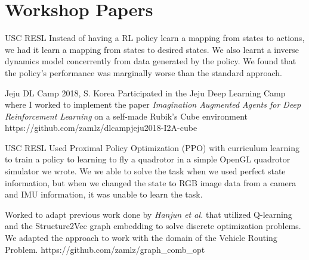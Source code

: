\documentclass{cv}
\begin{document}
\section{Workshop Papers}
\begin{adjustwidth}{0.5cm}{0.5cm}

\vspace{0.25cm}
\end{adjustwidth}

\begin{adjustwidth}{0.5cm}{0.5cm}

{USC RESL}
{Instead of having a RL policy learn a mapping from states to actions, we had
it learn a mapping from states to desired states. We also learnt a inverse
dynamics model concerrently from data generated by the policy. We found that
the policy's performance was marginally worse than the standard approach.}{}

{Jeju DL Camp 2018, S. Korea}
{Participated in the Jeju Deep Learning Camp where I worked to
implement the paper \textit{Imagination Augmented Agents for
Deep Reinforcement Learning} on a self-made Rubik's Cube environment}
{https://github.com/zamlz/dlcampjeju2018-I2A-cube}

{USC RESL}
{Used Proximal Policy Optimization (PPO) with curriculum learning to train a
policy to learning to fly a quadrotor in a simple OpenGL quadrotor simulator we
wrote. We we able to solve the task when we used perfect state information, but
when we changed the state to RGB image data from a camera and IMU information,
it was unable to learn the task.}{}

{Worked to adapt previous work done by \textit{Hanjun et al.} that utilized
Q-learning and the Structure2Vec graph embedding to solve discrete optimization
problems. We adapted the approach to work with the domain of the Vehicle
Routing Problem.}
{https://github.com/zamlz/graph_comb_opt}


\end{adjustwidth}
\end{document}
